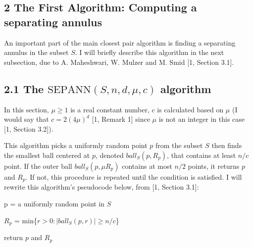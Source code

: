 \documentclass[12pt,english,]{article}
\newcommand{\pnt}[1]{{\scriptstyle#1}}
\let\origfigure\figure
\let\endorigfigure\endfigure
\renewenvironment{figure}[1][2] {
    \expandafter\origfigure\expandafter[H]
} {
    \endorigfigure
}
\begin{document}
\hypertarget{the-first-algorithm-computing-a-separating-annulus}{%
\subsection{\texorpdfstring{2 \enspace The First Algorithm: Computing a
separating
annulus}{2 The First Algorithm: Computing a separating annulus}}\label{the-first-algorithm-computing-a-separating-annulus}}

An important part of the main closest pair algorithm is finding a
separating annulus in the subset \(S\). I will briefly describe this
algorithm in the next subsection, due to A. Maheshwari, W. Mulzer and M.
Smid {[}1, Section 3.1{]}.

\hypertarget{the-mathrmspntepapntnnsndmuc-algorithm}{%
\subsection{\texorpdfstring{2.1 The
\(\mathrm{S\pnt{EP}A\pnt{NN}}(S,n,d,\mu,c)\)
algorithm}{2.1 The \textbackslash{}mathrm\{S\textbackslash{}pnt\{EP\}A\textbackslash{}pnt\{NN\}\}(S,n,d,\textbackslash{}mu,c) algorithm}}\label{the-mathrmspntepapntnnsndmuc-algorithm}}

In this section, \(\mu \ge1\) is a real constant number, \(c\) is
calculated based on \(\mu\) (I would say that \(c = 2(4\mu)^d\) {[}1,
Remark 1{]} since \(\mu\) is not an integer in this case {[}1, Section
3.2{]}).

This algorithm picks a uniformly random point \(p\) from the subset
\(S\) then finds the smallest ball centered at \(p\), denoted
\(ball_S(p, R_p)\), that contains at least \(n/c\) point. If the outer
ball \(ball_S(p,\mu R_p)\) contains at most \(n/2\) points, it returns
\(p\) and \(R_p\). If not, this procedure is repeated until the
condition is satisfied. I will rewrite this algorithm's pseudocode
below, from {[}1, Section 3.1{]}:

\medskip

\begin{figure}[ht]
  \centering
  \begin{minipage}{.8\linewidth}
    {\LinesNotNumbered
    \begin{algorithm}[H]
    \DontPrintSemicolon
    \SetAlgoLined
    \BlankLine
      {p = a uniformly random point in $S$

      $R_p$ = min\{$r > 0: |ball_S(p, r)| \geq n/c$\}}
      return $p$ and $R_p$
    \caption{\textsc{SepAnn}$(S,n,d,\mu,c)$}
    \end{algorithm}}
  \end{minipage}
\end{figure}
\end{document}
